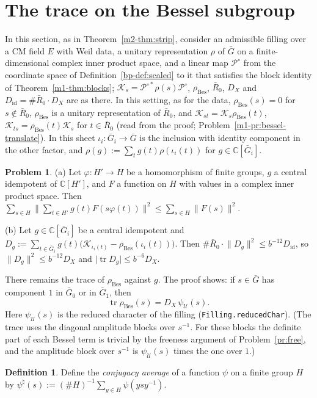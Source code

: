 \documentclass[reqno]{amsart}
\theoremstyle{plain}
\theoremstyle{definition}
\newtheorem{problem}{Problem}[section]
\newtheorem{definition}[theorem]{Definition}
\theoremstyle{remark}
\newcommand{\C}{\mathbb{C}}
\newcommand{\Gb}{\bar G}
\newcommand{\Rb}{\bar R_0}
\newcommand{\Po}{{\mathcal P^\circ}}
\newcommand{\Kc}{\mathcal K}
\newcommand{\Uc}{\mathcal U}
\newcommand{\rB}{\rho_{\mathrm{Bes}}}
\newcommand{\Did}{D_{\mathrm{id}}}
\newcommand{\tr}{\operatorname{tr}}
\newcommand{\tlus}{\textunderscore\allowbreak}
\newcommand{\tl}[1]{{\let\_\tlus\texttt{#1}}}
\begin{document}
\section{The trace on the Bessel subgroup}\label{sec:trace}

In this section, as in Theorem~\ref{m2-thm:strip}, consider an admissible filling over a CM field \(E\) with Weil data, a unitary representation \(\rho\) of \(\Gb\) on a finite-dimensional complex inner product space, and a linear map \(\Po\) from the coordinate space of Definition~\ref{bp-def:scaled} to it that satisfies the block identity of Theorem~\ref{m1-thm:blocks}; \(\Kc_s = \mathcal P^{\circ*}\rho(s)\Po\), \(\rB\), \(\Rb\), \(D_X\) and \(\Did = \#\Rb\cdot D_X\) are as there.  In this setting, as for the data, \(\rB(s) = 0\) for \(s \notin \Rb\), \(\rB\) is a unitary representation of \(\Rb\), and \(\Kc_{st} = \Kc_s\rB(t)\), \(\Kc_{ts} = \rB(t)\Kc_s\) for \(t \in \Rb\) (read from the proof; Problem~\ref{m1-pr:bessel-translate}).  In this sheet \(\iota_i\colon\Gb_i\to\Gb\) is the inclusion with identity component in the other factor, and \(\rho(g) := \sum_t g(t)\rho(\iota_i(t))\) for \(g \in \C[\Gb_i]\).

\begin{problem}\label{pr:conv}
(a) Let \(\varphi\colon H'\to H\) be a homomorphism of finite groups, \(g\) a central idempotent of \(\C[H']\), and \(F\) a function on \(H\) with values in a complex inner product space.  Then \(\sum_{s\in H}\lVert\sum_{t\in H'}g(t)F(s\varphi(t))\rVert^2\le\sum_{s\in H}\lVert F(s)\rVert^2\).

(b) Let \(g \in \C[\Gb_i]\) be a central idempotent and \(D_g := \sum_{t \in \Gb_i} g(t)\bigl(\Kc_{\iota_i(t)} - \rB(\iota_i(t))\bigr)\).  Then \(\#\Rb\cdot\lVert D_g\rVert^2 \le b^{-12}\Did\), so \(\lVert D_g\rVert^2 \le b^{-12}D_X\) and \(\lvert\tr D_g\rvert \le b^{-6}D_X\).
\end{problem}

There remains the trace of \(\rB\) against \(g\).  The proof shows: if \(s \in \Gb\) has component \(1\) in \(\Gb_0\) or in \(\Gb_1\), then
\[
 \tr\rB(s) = D_X\,\psi_{\Uc}(s).
\]
Here \(\psi_{\Uc}(s)\) is the reduced character of the filling \cite{GL} (\tl{Filling.reducedChar}).  (The trace uses the diagonal amplitude blocks over \(s^{-1}\). For these blocks the definite part of each Bessel term is trivial by the freeness argument of Problem~\ref{pr:free}, and the amplitude block over \(s^{-1}\) is \(\psi_{\Uc}(s)\) times the one over \(1\).)

\begin{definition}\label{def:conj-average}
Define the \emph{conjugacy average} of a function \(\psi\) on a finite group \(H\) by \(\psi^\natural(s) := (\#H)^{-1}\sum_{y \in H}\psi(ysy^{-1})\).
\end{definition}
\end{document}
